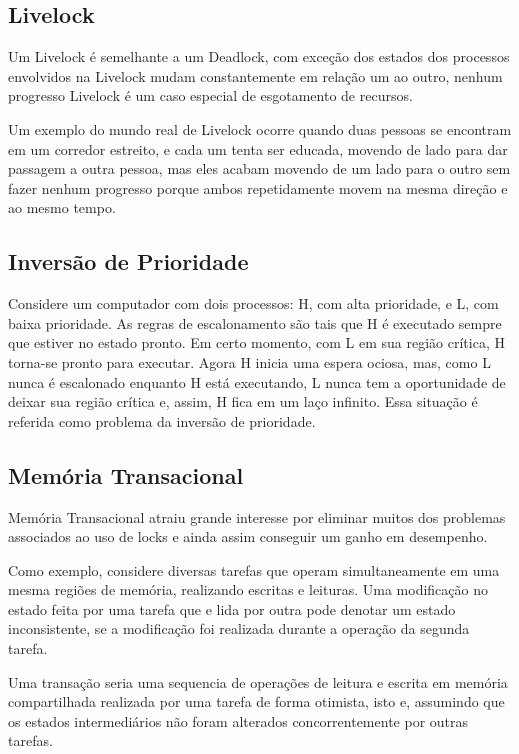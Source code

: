 \subsection{Livelock}

Um Livelock é semelhante a um Deadlock, com exceção dos estados dos processos envolvidos na 
Livelock mudam constantemente em relação um ao outro, nenhum progresso Livelock é um caso 
especial de esgotamento de recursos.

Um exemplo do mundo real de Livelock ocorre quando duas pessoas se encontram em um corredor 
estreito, e cada um tenta ser educada, movendo de lado para  dar passagem a outra pessoa, 
mas eles acabam movendo de um lado para o outro sem fazer nenhum progresso porque ambos 
repetidamente movem na mesma direção e ao mesmo tempo.

\subsection{Inversão de Prioridade}

Considere um computador com dois processos: H, com alta prioridade, e L, com baixa prioridade. 
As regras de escalonamento são tais que H é executado sempre que estiver no estado pronto. 
Em certo momento, com L em sua região crítica, H torna-se pronto para executar. Agora H inicia 
uma espera ociosa, mas, como L nunca é escalonado enquanto H está executando, L nunca tem a 
oportunidade de deixar sua região crítica e, assim, H fica em um laço infinito. Essa situação 
é referida como problema da inversão de prioridade.

\subsection{Memória Transacional}

Memória Transacional atraiu grande interesse por eliminar muitos dos 
problemas associados ao uso de locks e ainda assim conseguir um ganho em desempenho.


Como exemplo, considere diversas tarefas que operam simultaneamente em uma mesma regiões 
de memória, realizando escritas e leituras. Uma modificação no estado feita por uma tarefa 
que e lida por outra pode denotar um estado inconsistente, se a modificação foi realizada 
durante a operação da segunda tarefa.

Uma transação seria uma sequencia de operações de leitura e escrita em memória compartilhada 
realizada por uma tarefa de forma otimista, isto e, assumindo que os estados intermediários 
não foram alterados
 concorrentemente por outras tarefas.


